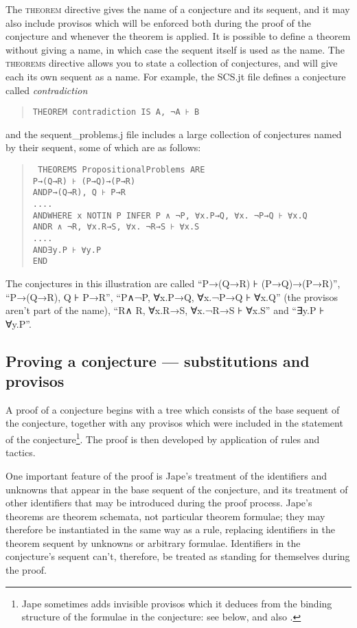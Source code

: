 The \textsc{theorem} directive gives the name of a conjecture and its sequent, and it may also include provisos which will be enforced both during the proof of the conjecture and whenever the theorem is applied. It is possible to define a theorem without giving a name, in which case the sequent itself is used as the name. The \textsc{theorems} directive allows you to state a collection of conjectures, and will give each its own sequent as a name. For example, the SCS.jt file defines a conjecture called \textit{contradiction}
\begin{quote}
\tt THEOREM contradiction IS A, ¬A ⊦ B
\end{quote}
and the sequent\_problems.j file includes a large collection of conjectures named by their sequent, some of which are as follows:
\begin{quote}\tt
THEOREMS PropositionalProblems ARE\\
\tab P→(Q→R) ⊦ (P→Q)→(P→R)\\
AND\tab P→(Q→R), Q ⊦ P→R\\
\tab ....\\
AND\tab WHERE x NOTIN P INFER P ∧ ¬P, ∀x.P→Q, ∀x. ¬P→Q ⊦ ∀x.Q \\
AND\tab R ∧ ¬R, ∀x.R→S, ∀x. ¬R→S ⊦ ∀x.S\\
....\\
AND\tab ∃y.P ⊦ ∀y.P\\
END
\end{quote}
The conjectures in this illustration are called ``P→(Q→R) ⊦ (P→Q)→(P→R)'', ``P→(Q→R), Q ⊦ P→R'', ``P∧¬P, ∀x.P→Q, ∀x.¬P→Q ⊦ ∀x.Q'' (the provisos aren't part of the name), ``R∧ R, ∀x.R→S, ∀x.¬R→S ⊦ ∀x.S'' and ``∃y.P ⊦ ∀y.P''.

\subsection{Proving a conjecture --- substitutions and provisos}

A proof of a conjecture begins with a tree which consists of the base sequent of the conjecture, together with any provisos which were included in the statement of the conjecture\footnote{Jape sometimes adds invisible provisos which it deduces from the binding structure of the formulae in the conjecture: see below, and also .}. The proof is then developed by application of rules and tactics.

One important feature of the proof is Jape's treatment of the identifiers and unknowns that appear in the base sequent of the conjecture, and its treatment of other identifiers that may be introduced during the proof process. Jape's theorems are theorem schemata, not particular theorem formulae; they may therefore be instantiated in the same way as a rule, replacing identifiers in the theorem sequent by unknowns or arbitrary formulae. Identifiers in the conjecture's sequent can't, therefore, be treated as standing for themselves during the proof.

